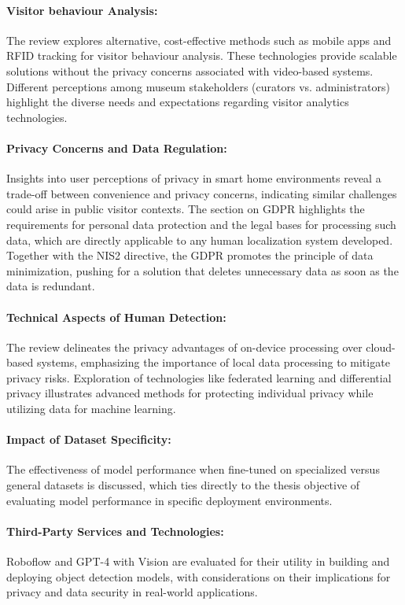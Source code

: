 \paragraph{Visitor behaviour Analysis:}
The review explores alternative, cost-effective methods such as mobile apps and RFID tracking for visitor behaviour analysis. These technologies provide scalable solutions without the privacy concerns associated with video-based systems. Different perceptions among museum stakeholders (curators vs. administrators) highlight the diverse needs and expectations regarding visitor analytics technologies.

\paragraph{Privacy Concerns and Data Regulation:}
Insights into user perceptions of privacy in smart home environments reveal a trade-off between convenience and privacy concerns, indicating similar challenges could arise in public visitor contexts. The section on GDPR highlights the requirements for personal data protection and the legal bases for processing such data, which are directly applicable to any human localization system developed. Together with the NIS2 directive, the GDPR promotes the principle of data minimization, pushing for a solution that deletes unnecessary data as soon as the data is redundant.

\paragraph{Technical Aspects of Human Detection:}
The review delineates the privacy advantages of on-device processing over cloud-based systems, emphasizing the importance of local data processing to mitigate privacy risks. Exploration of technologies like federated learning and differential privacy illustrates advanced methods for protecting individual privacy while utilizing data for machine learning.

\paragraph{Impact of Dataset Specificity:}
The effectiveness of model performance when fine-tuned on specialized versus general datasets is discussed, which ties directly to the thesis objective of evaluating model performance in specific deployment environments.

\paragraph{Third-Party Services and Technologies:}
Roboflow and GPT-4 with Vision are evaluated for their utility in building and deploying object detection models, with considerations on their implications for privacy and data security in real-world applications.
